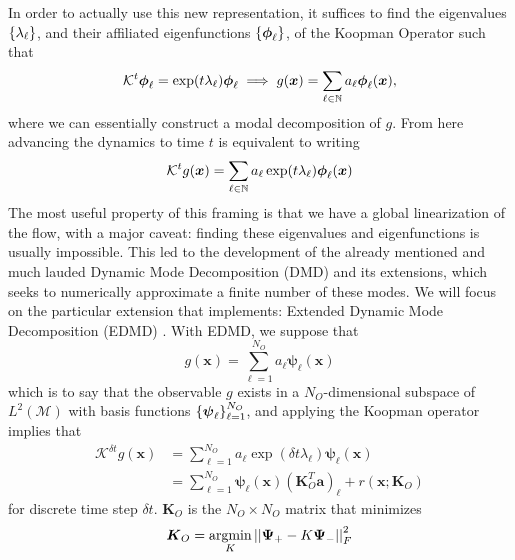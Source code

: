 In order to actually use this new representation, it suffices to find the 
eigenvalues $\left\{\lambda_\ell\right\}$, and their affiliated eigenfunctions 
$\left\{\boldsymbol{\phi}_\ell\right\}$, of the Koopman Operator such that
\begin{equation}
    \mathcal{K}^t\boldsymbol{\phi}_\ell = \exp(t\lambda_\ell)\boldsymbol{\phi}
    _\ell \implies g(\boldsymbol{x}) = \sum_{\ell \in \mathbb{N}} a_\ell \boldsymbol{\phi}_
    \ell(\boldsymbol{x}),    
\end{equation}
where we can essentially construct a modal decomposition of $g$. From here 
advancing the dynamics to time $t$ is equivalent to writing
\begin{equation}
    \mathcal{K}^{t} g(\boldsymbol{x}) = \sum_{\ell \in \mathbb{N}} a_\ell 
    \exp(t\lambda_\ell)\boldsymbol{\phi}_\ell (\boldsymbol{x})
\end{equation} 
The most useful property of this framing is that we have a global linearization 
of the flow, with a major caveat: finding these eigenvalues and 
eigenfunctions is usually impossible. This led to the development of the already 
mentioned and much lauded Dynamic Mode Decomposition (DMD) \cite{schmid} and its 
extensions, which seeks to numerically approximate a finite number of these 
modes. We will focus on the particular extension that \cite{lago} implements: 
Extended Dynamic Mode Decomposition (EDMD) \cite{williams}. With EDMD, we suppose that 
\begin{equation}
    g(\boldsymbol{x}) = \sum_{\ell = 1}^{N_O} a_\ell \boldsymbol{\psi}_\ell
    (\boldsymbol{x}) 
\end{equation}
which is to say that the observable $g$ exists in a $N_O$-dimensional subspace 
of $L^2(\mathcal{M})$ with basis functions $\left\{\boldsymbol{\psi}_\ell\right\}_{\ell=1}^{N_O}$, 
and applying the Koopman operator implies that
\begin{align} 
    \mathcal{K}^{\delta t} g(\boldsymbol{x}) &= \sum_{\ell = 1}^{N_O} a_\ell 
    \exp(\delta t\lambda_\ell)\boldsymbol{\psi}_\ell (\boldsymbol{x}) \\
    &= \sum_{\ell = 1}^{N_O} \boldsymbol{\psi}_\ell (\boldsymbol{x})
    (\boldsymbol{K}_O^T
    \boldsymbol{a})_\ell + r(\boldsymbol{x};\boldsymbol{K}_O)
\end{align}
for discrete time step $\delta t$. $\boldsymbol{K}_O$ is the $N_O\times N_O$ matrix that 
minimizes
\begin{equation}
    \boldsymbol{K}_O = \underset{K}{\text{argmin}}\left|\left|{\bf\Psi}_+ - K{\bf\Psi}_-\right|\right|_F^2
\end{equation}
